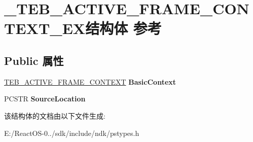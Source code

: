 \hypertarget{struct___t_e_b___a_c_t_i_v_e___f_r_a_m_e___c_o_n_t_e_x_t___e_x}{}\section{\+\_\+\+T\+E\+B\+\_\+\+A\+C\+T\+I\+V\+E\+\_\+\+F\+R\+A\+M\+E\+\_\+\+C\+O\+N\+T\+E\+X\+T\+\_\+\+E\+X结构体 参考}
\label{struct___t_e_b___a_c_t_i_v_e___f_r_a_m_e___c_o_n_t_e_x_t___e_x}
\subsection*{Public 属性}
\begin{DoxyCompactItemize}
\item 
\mbox{\label{struct___t_e_b___a_c_t_i_v_e___f_r_a_m_e___c_o_n_t_e_x_t___e_x_ae775159c56995fd264f5e67e2b1f87e9}} 
\hyperlink{struct___t_e_b___a_c_t_i_v_e___f_r_a_m_e___c_o_n_t_e_x_t}{T\+E\+B\+\_\+\+A\+C\+T\+I\+V\+E\+\_\+\+F\+R\+A\+M\+E\+\_\+\+C\+O\+N\+T\+E\+XT} {\bfseries Basic\+Context}
\item 
\mbox{\label{struct___t_e_b___a_c_t_i_v_e___f_r_a_m_e___c_o_n_t_e_x_t___e_x_a66be01940e7c39c4990b32f713b59e30}} 
P\+C\+S\+TR {\bfseries Source\+Location}
\end{DoxyCompactItemize}


该结构体的文档由以下文件生成\+:\begin{DoxyCompactItemize}
\item 
E\+:/\+React\+O\+S-\/0../sdk/include/ndk/pstypes.\+h\end{DoxyCompactItemize}
